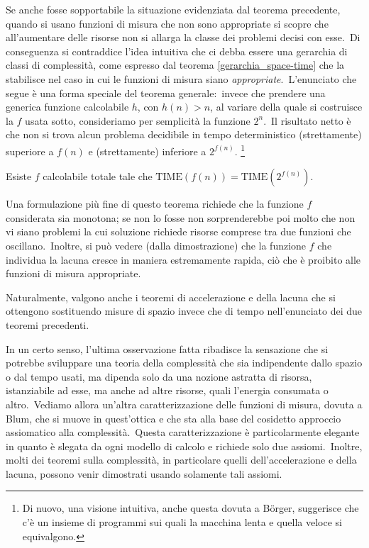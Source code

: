Se anche fosse sopportabile la situazione evidenziata dal teorema precedente, quando si usano funzioni di misura che non sono appropriate si scopre che all'aumentare delle risorse non si allarga la classe dei problemi decisi con esse.\
Di conseguenza si contraddice l'idea intuitiva che ci debba essere una gerarchia di classi di complessità, come espresso dal teorema \ref{gerarchia_space-time} che la stabilisce nel caso in cui le funzioni di misura siano \textit{appropriate}.\
L'enunciato che segue è una forma speciale del teorema generale:\ invece che prendere una generica funzione calcolabile $h$, con $h(n) > n$, al variare della quale si costruisce la $f$ usata sotto, consideriamo per semplicità la funzione $2^n$.\
Il risultato netto è che non si trova alcun problema decidibile in tempo deterministico (strettamente) superiore a $f(n)$ e (strettamente) inferiore a $2^{f(n)}$.
\footnote{ Di nuovo, una visione intuitiva, anche questa dovuta a B\"orger, suggerisce che c'è un insieme di programmi sui quali la macchina lenta e quella veloce si equivalgono.}

\begin{theorem} [della lacuna, Borodin]
    Esiste $f$ calcolabile totale tale che $\mathrm{TIME}(f(n)) = \mathrm{TIME}\left(2^{f(n)}\right)$.
\end{theorem}

\noindent Una formulazione più fine di questo teorema richiede che la funzione $f$ considerata sia monotona; se non lo fosse non sorprenderebbe poi molto che non vi siano problemi la cui soluzione richiede risorse comprese tra due funzioni che oscillano.\
Inoltre, si può vedere (dalla dimostrazione) che la funzione $f$ che individua la lacuna cresce in maniera estremamente rapida, ciò che è proibito alle funzioni di misura appropriate.\

Naturalmente, valgono anche i teoremi di accelerazione e della lacuna che si ottengono sostituendo misure di spazio invece che di tempo nell'enunciato dei due teoremi precedenti.\

\medskip
\noindent In un certo senso, l'ultima osservazione fatta ribadisce la sensazione che si potrebbe sviluppare una teoria della complessità che sia indipendente dallo spazio o dal tempo usati, ma dipenda solo da una nozione astratta di risorsa, istanziabile ad esse, ma anche ad altre risorse, quali l'energia consumata o altro.\
Vediamo allora un'altra caratterizzazione delle funzioni di misura, dovuta a Blum, che si muove in quest'ottica e che sta alla base del cosidetto approccio assiomatico alla complessità.\
Questa caratterizzazione è particolarmente elegante in quanto è slegata da ogni modello di calcolo e richiede solo due assiomi.\
Inoltre, molti dei teoremi sulla complessità, in particolare quelli dell'accelerazione e della lacuna, possono venir dimostrati usando solamente tali assiomi.\

